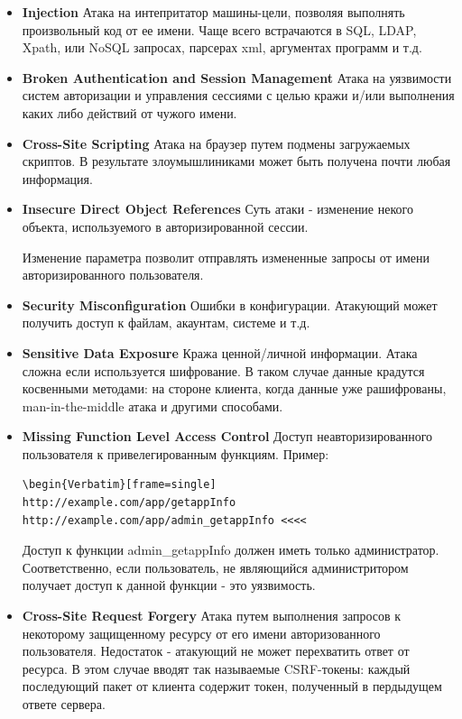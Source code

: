 \documentclass[utf8x, 12pt]{G7-32}
\begin{document}
\begin{itemize}
\item {\textbf{Injection} Атака на интепритатор машины-цели, позволяя выполнять произвольный код от ее имени. Чаще всего встрачаются в SQL, LDAP, Xpath, или NoSQL запросах, парсерах xml, аргументах программ и т.д.}

\item {\textbf{Broken Authentication and Session Management} Атака на уязвимости систем авторизации и управления сессиями с целью кражи и/или выполнения каких либо действий от чужого имени.}

\item {\textbf{Cross-Site Scripting} Атака на браузер путем подмены загружаемых скриптов. В результате злоумышлиниками может быть получена почти любая информация.}

\item {\textbf{Insecure Direct Object References} Суть атаки - изменение некого объекта, используемого в авторизированной сессии. 

Изменение параметра позволит отправлять измененные запросы от имени авторизированного пользователя.}

\item {\textbf{Security Misconfiguration} Ошибки в конфигурации. Атакующий может получить доступ к файлам, акаунтам, системе и т.д.}

\item {\textbf{Sensitive Data Exposure} Кража ценной/личной информации. Атака сложна если используется шифрование. В таком случае данные крадутся косвенными методами: на стороне клиента, когда данные уже рашифрованы, man-in-the-middle атака и другими способами.}

\item {\textbf{Missing Function Level Access Control} Доступ неавторизированного пользователя к привелегированным функциям. 
Пример: 

\begin{lstlisting}
\begin{Verbatim}[frame=single]
http://example.com/app/getappInfo
http://example.com/app/admin_getappInfo <<<<
\end{lstlisting}
Доступ к функции admin\_getappInfo должен иметь только администратор. Соответственно, если пользователь, не являющийся администритором получает доступ к данной функции - это уязвимость.}

\item {\textbf{Cross-Site Request Forgery} Атака путем выполнения запросов к некоторому защищенному ресурсу от его имени авторизованного пользователя. Недостаток - атакующий не может перехватить ответ от ресурса. В этом случае вводят так называемые CSRF-токены: каждый последующий пакет от клиента содержит токен, полученный в пердыдущем ответе сервера.}


\end{itemize}
\end{document}
